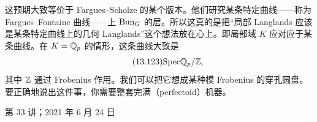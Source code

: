 这预期大致等价于 Fargues–Scholze 的某个版本。他们研究某条特定曲线——称为 Fargues–Fontaine 曲线——上 $\mathrm{Bun}_G$ 的层。所以这真的是把“局部 Langlands 应该是某条特定曲线上的几何 Langlands”这个想法放在心上。即局部域 $K$ 应对应于某条曲线。在 $K=\mathbb{Q}_p$ 的情形，这条曲线大致是
\begin{equation}\tag{13.123}
\mathrm{Spec}\mathbb{Q}_p/\mathbb{Z},
\end{equation}
其中 $\mathbb{Z}$ 通过 Frobenius 作用。我们可以把它想成某种模 Frobenius 的穿孔圆盘。要正确地说出这件事，你需要整套完满（perfectoid）机器。

\begin{flushright}\small 第 33 讲；2021 年 6 月 24 日\end{flushright}
